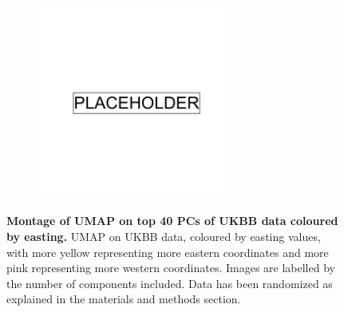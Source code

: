 \begin{figure}
    \centering
    \begin{subfigure}{\textwidth}
    \includegraphics[width=0.7\textwidth]{placeholder.png}
    \end{subfigure}
    \caption[Montage of UMAP on top 40 PCs of UKBB data coloured by easting]{\textbf{Montage of UMAP on top 40 PCs of UKBB data coloured by easting.} UMAP on UKBB data, coloured by easting values, with more yellow representing more eastern coordinates and more pink representing more western coordinates. Images are labelled by the number of components included. Data has been randomized as explained in the materials and methods section.}
    \label{fig:supp_montage_ukbb_ew}
\end{figure}

\newpage

